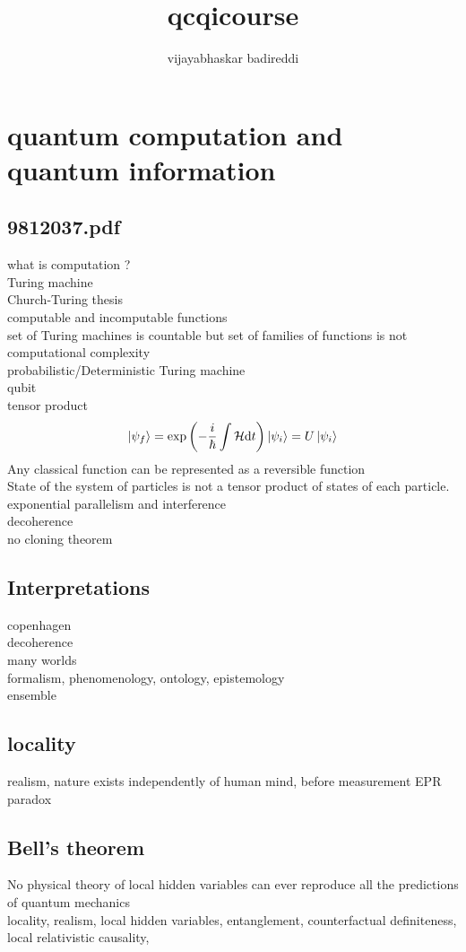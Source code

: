 \documentclass[12pt] {article}
\title{qcqicourse}
\author{vijayabhaskar badireddi}
\begin{document}
        
\section*{quantum computation and quantum information}
\subsection*{9812037.pdf}
what is computation ?\\
Turing machine\\
Church-Turing thesis\\
computable and incomputable functions\\
set of Turing machines is countable but set of families of functions is not\\
computational complexity\\
probabilistic/Deterministic Turing machine\\
qubit\\
tensor product\\
\[\ket{\psi_f}=\exp\qty(-\frac{i}{\hbar}\int \mathcal{H} \dd t)\ket{\psi_i}=U\ket{\psi_i}\]
Any classical function can be represented as a reversible function\\
State of the system of particles is not a tensor product of states of each particle.\\
exponential parallelism and interference\\  
decoherence\\
no cloning theorem\\
\newpage
\subsection*{Interpretations}
copenhagen\\
decoherence\\
many worlds\\
formalism, phenomenology, ontology, epistemology\\
ensemble\\
\subsection*{locality}
realism, nature exists independently of human mind, before measurement
EPR paradox
\subsection*{Bell's theorem}
No physical theory of local hidden variables can ever reproduce all the predictions of quantum mechanics\\
locality, realism, local hidden variables, entanglement, counterfactual definiteness, local relativistic causality, 
\end{document}
